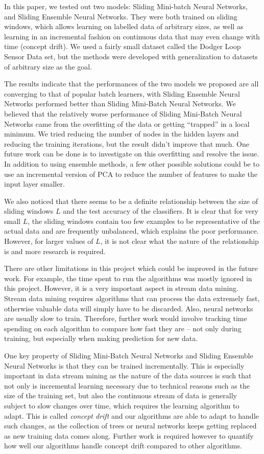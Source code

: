 \documentclass[conference]{IEEEtran}
\begin{document}
		In this paper, we tested out two models: Sliding Mini-batch Neural Networks,  and Sliding Ensemble Neural Networks. They were both trained on sliding windows, which allows learning on labelled data of arbitrary sizes, as well as learning in an incremental fashion on continuous data that may even change with time (concept drift). We used a fairly small dataset called the Dodger Loop Sensor Data set, but the methods were developed with generalization to datasets of arbitrary size as the goal.
		
		The results indicate that the performances of the two models we proposed are all converging to that of popular batch learners, with Sliding Ensemble Neural Networks performed better than Sliding Mini-Batch Neural Networks. We believed that the relatively worse performance of  Sliding Mini-Batch Neural Networks came from the overfitting of the data or getting ``trapped'' in a local minimum. We tried reducing the number of nodes in the hidden layers and reducing the training iterations, but the result didn't improve that much. One future work can be done is to investigate on this overfitting and resolve the issue. In addition to using ensemble methods, a few other possible solutions could be to use an incremental version of PCA to reduce the number of features to make the input layer smaller.
		
		We also noticed that there seems to be a definite relationship between the size of sliding windows $L$ and the test accuracy of the classifiers. It is clear that for very small $L$, the sliding windows contain too few examples to be representative of the actual data and are frequently unbalanced, which explains the poor performance. However, for larger values of $L$, it is not clear what the nature of the relationship is and more research is required.
		
		There are other limitations in this project which could be improved in the future work. For example, the time spent to run the algorithms was mostly ignored in this project. However, it is a very important aspect in stream data mining. Stream data mining requires algorithms that can process the data extremely fast, otherwise valuable data will simply have to be discarded. Also, neural networks are usually slow to train. Therefore, further work would involve tracking time spending on each algorithm to compare how fast they are -- not only during training, but especially when making prediction for new data.
		
		
		One key property of   Sliding Mini-Batch Neural Networks and Sliding Ensemble Neural Networks is that they can be trained incrementally. This is especially important in data stream mining as the nature of the data sources is such that not only is incremental learning necessary due to technical reasons such as the size of the training set, but also the continuous stream of data is generally subject to slow changes over time, which requires the learning algorithm to adapt. This is called \emph{concept drift} and our algorithms are able to adapt to handle such changes, as the collection of trees or neural networks keeps getting replaced as new training data comes along. Further work is required however to quantify how well our algorithms handle concept drift compared to other algorithms.
		
\end{document}
